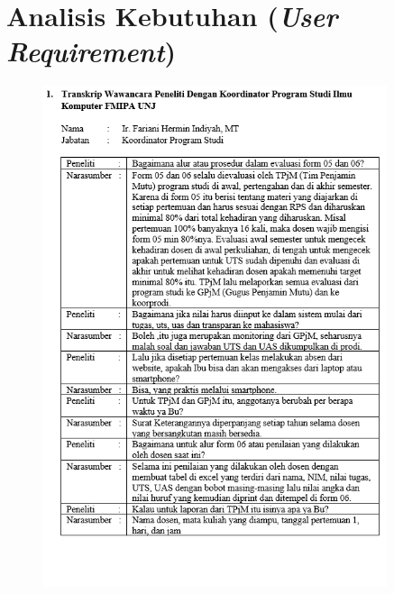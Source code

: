 \appendix
\chapter{Analisis Kebutuhan (\textit{User Requirement})}
\begin{figure}[H]
	\centering
	\includegraphics[width=0.9\textwidth]{gambar/lampiran/UR-1}	
\end{figure}
